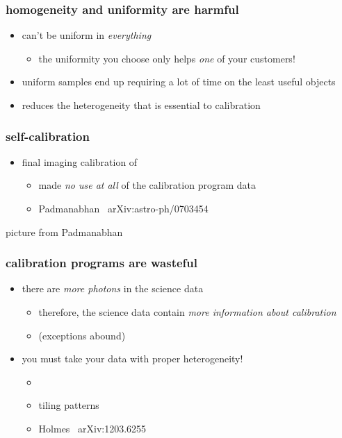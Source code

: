 \documentclass[pdftex]{beamer}
\begin{document}
\begin{frame}
  \frametitle{homogeneity and uniformity are harmful}
  \begin{itemize}
  \item can't be uniform in \emph{everything}
    \begin{itemize}
    \item the uniformity you choose only helps \emph{one} of your customers!
    \end{itemize}
  \item uniform samples end up requiring a lot of time on the least useful objects
  \item reduces the heterogeneity that is essential to calibration
  \end{itemize}
\end{frame}

\begin{frame}
  \frametitle{self-calibration}
  \begin{itemize}
  \item final imaging calibration of \sdss
    \begin{itemize}
    \item made \emph{no use at all} of the calibration program data
    \item Padmanabhan \etal\ arXiv:astro-ph/0703454
    \end{itemize}
  \end{itemize}
\end{frame}

\begin{frame}
picture from Padmanabhan
\end{frame}

\begin{frame}
  \frametitle{calibration programs are wasteful}
  \begin{itemize}
  \item there are \emph{more photons} in the science data
    \begin{itemize}
    \item therefore, the science data contain \emph{more information about calibration}
    \item (exceptions abound)
    \end{itemize}
  \item you must take your data with proper heterogeneity!
    \begin{itemize}
    \item \kepler
    \item tiling patterns
    \item Holmes \etal\ arXiv:1203.6255
    \end{itemize}
  \end{itemize}
\end{frame}
\end{document}
